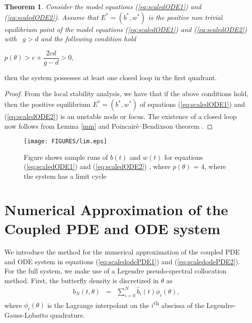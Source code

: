 \documentclass[review,authoryear]{elsarticle}
\newtheorem{theorem}{Theorem}[section]
\begin{document}
\begin{theorem}
   Consider the model equations (\ref{eq:scaledODE1}) and
  (\ref{eq:scaledODE2}). Assume that $E^{\ast }=(b^{\ast },w^{\ast })$
  is the positive non trivial equilibrium point of the model equations
  (\ref{eq:scaledODE1}) and (\ref{eq:scaledODE2}) with \ $g>d$ and the
  following condition hold
\end{theorem}

\begin{center}
$%
p(\theta )>c+\dfrac{2cd}{g-d}>0,$
\end{center}

then the system possesses at least one closed loop in the first quadrant.

\begin{proof}
  From the local stability analysis, we have that if the above
  conditions hold, then the positive equilibrium
  $E^{\ast }=(b^{\ast },w^{\ast })$ of equations (\ref{eq:scaledODE1})
  and (\ref{eq:scaledODE2}) is an unstable node or focus. The
  existence of a closed loop now follows from Lemma \ref{mm} and
  Poincair{\`e}--Bendixson theorem \citep{nonlinearChaos}.
\end{proof}

\begin{figure}[!htp]
\begin{center}
\texttt{[image: FIGURES/lim.eps]}  

\end{center}

\caption{Figure shows sample runs of $b(t)$ and $w(t)$ for equations
  (\ref{eq:scaledODE1}) and (\ref{eq:scaledODE2}) , where
  $p(\theta )$ = 4, where the system has a limit cycle }
      \label{fig:lim}
\end{figure}


\section{Numerical Approximation of the Coupled PDE and ODE system}
\label{numericalApproximation}

We introduce the method for the numerical approximation of the coupled
PDE and ODE system in equations (\ref{eq:scaledodePDE1}) and
(\ref{eq:scaledodePDE2}). For the full system, we make use of a
Legendre pseudo-spectral collocation
method\citep{spectralMethodsFluids,hesthaven_gottlieb_gottlieb_2007,gottlieb1977numerical}. First,
the butterfly density is discretized in $\theta$ as
\begin{eqnarray}
  \label{eqn:spatialDiscretization}
  b_N(t,\theta) & = & \sum^N_{i=0} \hat{b}_i(t) \phi_i(\theta),
\end{eqnarray}
where $\phi_i(\theta)$ is the Lagrange interpolant on the
$i$\textsuperscript{th} abscissa of the Legendre-Gauss-Lobatto
quadrature\citep{hesthaven_gottlieb_gottlieb_2007}.
\end{document}
